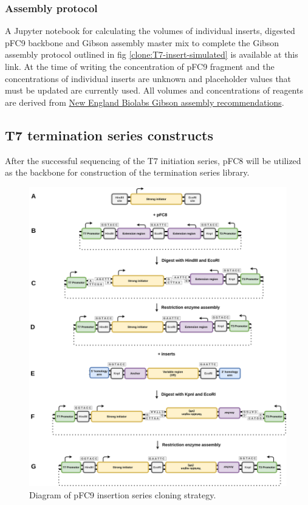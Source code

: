 \documentclass[11pt]{article}
\begin{document}
\subsubsection{Assembly protocol}

A Jupyter notebook for calculating the volumes of individual inserts, digested pFC9 backbone and Gibson assembly master mix to complete the Gibson assembly protocol outlined in fig \ref{clone:T7-insert-simulated} is available at this link. At the time of writing the concentration of pFC9 fragment and the concentrations of individual inserts are unknown and placeholder values that must be updated are currently used. All volumes and concentrations of reagents are derived from \href{https://www.neb.com/protocols/2012/12/11/gibson-assembly-protocol-e5510}{New England Biolabs Gibson assembly recommendations}.


\subsection{T7 termination series constructs}

After the successful sequencing of the T7 initiation series, pFC8 will be utilized as the backbone for construction of the termination series library. 

\begin{figure}[H]
	\includegraphics[width=15cm]{images/cloning_diagrams/construct_diagrams-T7-termination-series.png}
	\centering
	\caption{Diagram of pFC9 insertion series cloning strategy.}
	\label{clone:T7-term}
	
\end{figure}
\end{document}
